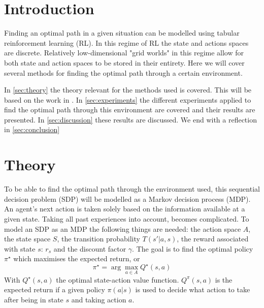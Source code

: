 \documentclass{article}
\theoremstyle{plain}
\theoremstyle{definition}
\theoremstyle{remark}
\begin{document}
\newpage
\begin{abstract}

This article is about implementing Reinforcement Learning various algorithms on a grid world problem with stochastic factors. The algorithms are run in enough explained iterations to use the previous learnings, to be able to converge to the terminal state in less steps. Every algorithm is also run multiple times to generate more results so as to be more reliably comparable with the other algorithms. The approaches and algorithms included are "\textbf{Dynamic Programming (DP)}", "\textbf{Exploration Techniques}", "\textbf{On-policy versus Off-policy}" and "\textbf{Depth of Target}".
\end{abstract}

\section{Introduction} \label{sec:introduction}
Finding an optimal path in a given situation can be modelled using tabular reinforcement learning (RL). In this regime of RL the state and actions spaces are discrete. Relatively low-dimensional "grid worlds" in this regime allow for both state and action spaces to be stored in their entirety. Here we will cover several methods for finding the optimal path through a certain environment.  

In \autoref{sec:theory} the theory relevant for the methods used is covered. This will be based on the work in \cite{RL_book}.
In \autoref{sec:experiments} the different experiments applied to find the optimal path through this environment are covered and their results are presented. In \autoref{sec:discussion} these results are discussed. We end with a reflection in \autoref{sec:conclusion}

\section{Theory}\label{sec:theory}
To be able to find the optimal path through the environment used, this sequential decision problem (SDP) will be modelled as a Markov decision process (MDP). An agent's next action is taken solely based on the information available at a given state. Taking all past experiences into account, becomes complicated. To model an SDP as an MDP the following things are needed: the action space $A$, the state space $S$, the transition probability $T(s'|a,s)$, the reward associated with state $s$: $r_s$ and the discount factor $\gamma$. The goal is to find the optimal policy $\pi^\star$ which maximises the expected return, or
\begin{equation}
    \pi^\star = \arg\max_{a\in A} Q^\star(s,a)
    \label{eq:RL_goal}
\end{equation}
With $Q^\star(s,a)$ the optimal state-action value function. $Q^\pi(s,a)$ is the expected return if a given policy $\pi(a|s)$ is used to decide what action to take after being in state $s$ and taking action $a$.
\end{document}
